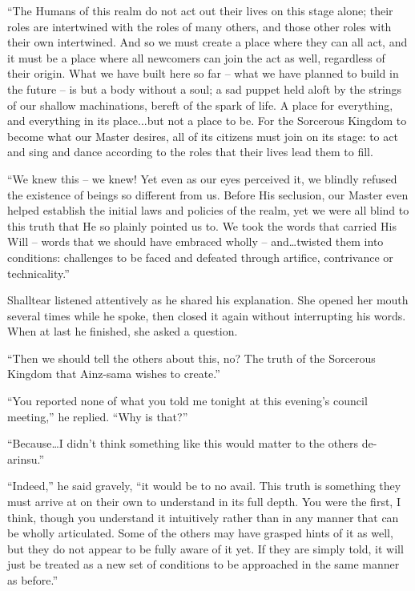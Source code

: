 “The Humans of this realm do not act out their lives on this stage alone; their roles are intertwined with the roles of many others, and those other roles with their own intertwined. And so we must create a place where they can all act, and it must be a place where all newcomers can join the act as well, regardless of their origin. What we have built here so far – what we have planned to build in the future – is but a body without a soul; a sad puppet held aloft by the strings of our shallow machinations, bereft of the spark of life. A place for everything, and everything in its place...but not a place to be. For the Sorcerous Kingdom to become what our Master desires, all of its citizens must join on its stage: to act and sing and dance according to the roles that their lives lead them to fill.

 

“We knew this – we knew! Yet even as our eyes perceived it, we blindly refused the existence of beings so different from us. Before His seclusion, our Master even helped establish the initial laws and policies of the realm, yet we were all blind to this truth that He so plainly pointed us to. We took the words that carried His Will – words that we should have embraced wholly – and…twisted them into conditions: challenges to be faced and defeated through artifice, contrivance or technicality.”

 

Shalltear listened attentively as he shared his explanation. She opened her mouth several times while he spoke, then closed it again without interrupting his words. When at last he finished, she asked a question.

 

“Then we should tell the others about this, no? The truth of the Sorcerous Kingdom that Ainz-sama wishes to create.”

 

“You reported none of what you told me tonight at this evening’s council meeting,” he replied. “Why is that?”

 

“Because…I didn’t think something like this would matter to the others de-arinsu.”

 

“Indeed,” he said gravely, “it would be to no avail. This truth is something they must arrive at on their own to understand in its full depth. You were the first, I think, though you understand it intuitively rather than in any manner that can be wholly articulated. Some of the others may have grasped hints of it as well, but they do not appear to be fully aware of it yet. If they are simply told, it will just be treated as a new set of conditions to be approached in the same manner as before.”

